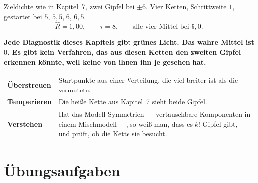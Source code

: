 \begin{warnung}
Zieldichte wie in Kapitel~7, zwei Gipfel bei $\pm6$. Vier Ketten, Schrittweite $1$, gestartet bei $5$, $5{,}5$, $6$, $6{,}5$.
\[ \hat R = 1{,}00, \qquad \tau = 8, \qquad \text{alle vier Mittel bei } 6{,}0 . \]

\begin{center}
\begin{minipage}{0.9\textwidth}
\textbf{Jede Diagnostik dieses Kapitels gibt grünes Licht. Das wahre Mittel ist $0$. Es gibt kein Verfahren, das aus diesen Ketten den zweiten Gipfel erkennen könnte, weil keine von ihnen ihn je gesehen hat.}
\end{minipage}
\end{center}

\begin{center}
{\small
\renewcommand{\arraystretch}{1.5}
\begin{tabular}{@{}P{2.8cm}P{5.8cm}@{}}
\toprule
\textbf{Überstreuen} & Startpunkte aus einer Verteilung, die viel breiter ist als die vermutete.\\
\textbf{Temperieren} & Die heiße Kette aus Kapitel~7 sieht beide Gipfel.\\
\textbf{Verstehen} & Hat das Modell Symmetrien --- vertauschbare Komponenten in einem Mischmodell ---, so weiß man, dass es $k!$ Gipfel gibt, und prüft, ob die Kette sie besucht.\\
\bottomrule
\end{tabular}}
\end{center}

\begin{center}
\begin{minipage}{0.88\textwidth}
\end{minipage}
\end{center}
\end{warnung}

\section{Übungsaufgaben}

